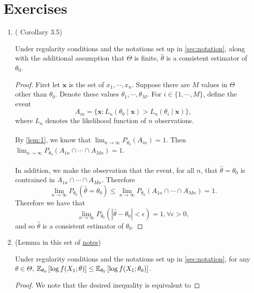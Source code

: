 

\section{Exercises}
\begin{enumerate}
\item (\cite{lehmann2006theory} Corollary 3.5)
\begin{lemma}\label{ex1}
Under regularity conditions and the notations set up in \cref{sec:notation}, along with the additional assumption that $\Theta$ is finite, $\hat{\theta}$ is a consistent estimator of $\theta_0$.
\end{lemma}
\begin{proof}
First let $\bm{x}$ is the set of \iid $x_1,\cdots,x_n$. Suppose there are $M$ values in $\Theta$ other than $\theta_0$. Denote these values $\theta_1,\cdots,\theta_M$. For $i\in\{1,\cdots,M\}$, define the event
\[
A_{in} = \{\bm{x}: L_n(\theta_0\mid\bm{x}) > L_n(\theta_i\mid\bm{x})\},
\]
where $L_n$ denotes the likelihood function of $n$ observations.\\\\
By \cref{lem:1}, we know that $\lim_{n\to\infty}P_{\theta_0}(A_{in}) = 1$. Then $\lim_{n\to\infty}P_{\theta_0}(A_{1n}\cap\cdots\cap A_{Mn}) = 1$.\\\\
In addition, we make the observation that the event, for all $n$, that $\hat{\theta}=\theta_0$ is contrained in $A_{1n}\cap\cdots\cap A_{Mn}$. Therefore
\[
\lim_{n\to\infty}P_{\theta_0}(\hat{\theta} = \theta_0) \leq \lim_{n\to\infty}P_{\theta_0}(A_{1n}\cap\cdots\cap A_{Mn}) = 1.
\]
Therefore we have that
\[
\lim_{n\to\infty}P_{\theta_0}(|\hat{\theta} - \theta_0|<\epsilon)=1, \forall \epsilon>0,
\]
and so $\hat{\theta}$ is a consistent estimator of $\theta_0$.
\end{proof}
\item (Lemma in this set of \href{https://ocw.mit.edu/courses/mathematics/18-443-statistics-for-applications-fall-2006/lecture-notes/lecture3.pdf}{notes})
\begin{lemma}\label{ex2}
Under regularity conditions and the notations set up in \cref{sec:notation}, for any $\theta\in\Theta$, $\mathbb{E}_{\theta_0}\left[ \log f(X_1;\theta) \right] \leq \mathbb{E}_{\theta_0}\left[ \log f(X_1;\theta_0) \right]$.
\end{lemma}
\begin{proof}
We note that the desired inequality is equivalent to

\end{proof}
\end{enumerate}
